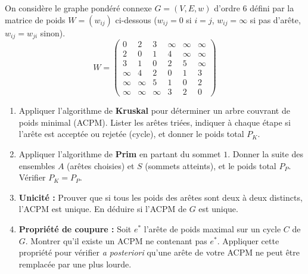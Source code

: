 \documentclass[11pt]{article}
\begin{document}
\begin{exercice}
On considère le graphe pondéré connexe $G=(V,E,w)$ d'ordre $6$ défini par la matrice de poids $W=(w_{ij})$ ci-dessous ($w_{ij}=0$ si $i=j$, $w_{ij}=\infty$ si pas d'arête, $w_{ij}=w_{ji}$ sinon).
\[
W = \begin{pmatrix}
0 & 2 & 3 & \infty & \infty & \infty \\
2 & 0 & 1 & 4 & \infty & \infty \\
3 & 1 & 0 & 2 & 5 & \infty \\
\infty & 4 & 2 & 0 & 1 & 3 \\
\infty & \infty & 5 & 1 & 0 & 2 \\
\infty & \infty & \infty & 3 & 2 & 0
\end{pmatrix}
\]
\begin{enumerate}
    \item Appliquer l'algorithme de \textbf{Kruskal} pour déterminer un arbre couvrant de poids minimal (ACPM). Lister les arêtes triées, indiquer à chaque étape si l'arête est acceptée ou rejetée (cycle), et donner le poids total $P_K$.
    \item Appliquer l'algorithme de \textbf{Prim} en partant du sommet $1$. Donner la suite des ensembles $A$ (arêtes choisies) et $S$ (sommets atteints), et le poids total $P_P$. Vérifier $P_K = P_P$.
    \item \textbf{Unicité :} Prouver que si tous les poids des arêtes sont deux à deux distincts, l'ACPM est unique. En déduire si l'ACPM de $G$ est unique.
    \item \textbf{Propriété de coupure :} Soit $e^*$ l'arête de poids maximal sur un cycle $C$ de $G$. Montrer qu'il existe un ACPM ne contenant pas $e^*$. Appliquer cette propriété pour vérifier \textit{a posteriori} qu'une arête de votre ACPM ne peut être remplacée par une plus lourde.
\end{enumerate}
\end{exercice}
\end{document}
